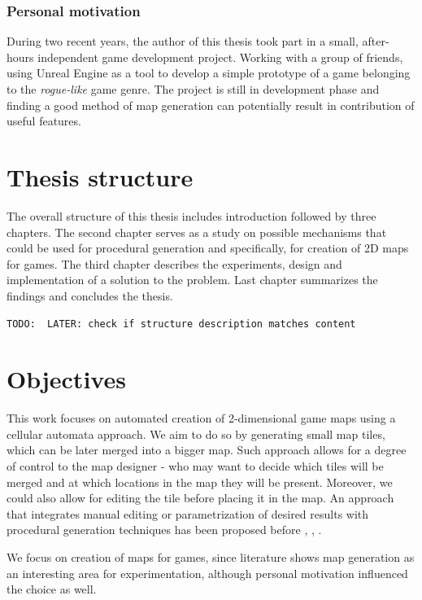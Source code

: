 \documentclass[12pt]{report}
\newcommand{\todo}[1]{}
\renewcommand{\todo}[1]{{\color{red} \par \noindent \footnotesize \texttt{TODO: {#1} }}}
\begin{document}
\subsubsection{Personal motivation}
During two recent years, the author of this thesis took part in a small, after-hours independent game development project. Working with a group of friends, using Unreal Engine as a tool to develop a simple prototype of a game belonging to the \textit{rogue-like} game genre. The project is still in development phase and finding a good method of map generation can potentially result in contribution of useful features.

\section{Thesis structure}
The overall structure of this thesis includes introduction followed by three chapters. The second chapter serves as a study on possible mechanisms that could be used for procedural generation and specifically, for creation of 2D maps for games. The third chapter describes the experiments, design and implementation of a solution to the problem. Last chapter summarizes the findings and concludes the thesis. 

\todo{ LATER: check if structure description matches content}

\section{Objectives}

This work focuses on automated creation of 2-dimensional game maps using a cellular automata approach. We aim to do so by generating small map tiles, which can be later merged into a bigger map. Such approach allows for a degree of control to the map designer - who may want to decide which tiles will be merged and at which locations in the map they will be present. Moreover, we could also allow for editing the tile before placing it in the map. An approach that integrates manual editing or parametrization of desired results with procedural generation techniques has been proposed before \autocite{bidarra2010integrating}, \autocite{smelik2010integrating}, \autocite{smelik2011declarative}.

We focus on creation of maps for games, since literature shows map generation as an interesting area for experimentation, although personal motivation influenced the choice as well.
\end{document}

